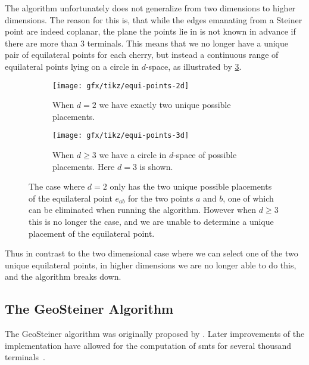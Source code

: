 The algorithm unfortunately does not generalize from two dimensions to higher
dimensions. The reason for this is, that while the edges emanating from a
Steiner point are indeed coplanar, the plane the points lie in is not known in
advance if there are more than $3$ terminals. This means that we no longer have
a unique pair of equilateral points for each cherry, but instead a continuous
range of equilateral points lying on a circle in $d$-space, as illustrated by
\cref{fig:equi-points}.
%
\begin{figure}[htbp]
  \centering
  \begin{subfigure}[t]{0.4\textwidth}
    \texttt{[image: gfx/tikz/equi-points-2d]}
    \caption{When $d = 2$ we have exactly two unique possible
      placements.\label{fig:equi-points-2d}}
  \end{subfigure}\hspace{1em}%
  \begin{subfigure}[t]{0.4\textwidth}
    \texttt{[image: gfx/tikz/equi-points-3d]}
    \caption{When $d \ge 3$ we have a circle in $d$-space of possible
      placements. Here $d = 3$ is shown.\label{fig:equi-points-3d}}
  \end{subfigure}
  \caption[Equilateral points in 2D and $d$-space]{The case where $d = 2$ only
    has the two unique possible placements of the equilateral point $e_{ab}$ for the
    two points $a$ and $b$, one of which can be eliminated when running the
    algorithm. However when $d \ge 3$ this is no longer the case, and we are
    unable to determine a unique placement of the equilateral
    point.\label{fig:equi-points}}
\end{figure}
%
Thus in contrast to the two dimensional case where we can select one of the two
unique equilateral points, in higher dimensions we are no longer able to do
this, and the algorithm breaks down.

\subsection{The GeoSteiner Algorithm}
\label{sec:geosteiner-algorithm}

The GeoSteiner algorithm was originally proposed by \textcite{winter1985}. Later
improvements of the implementation have allowed for the computation of \acp{smt}
for several thousand terminals~\cite{brazil2015}.

